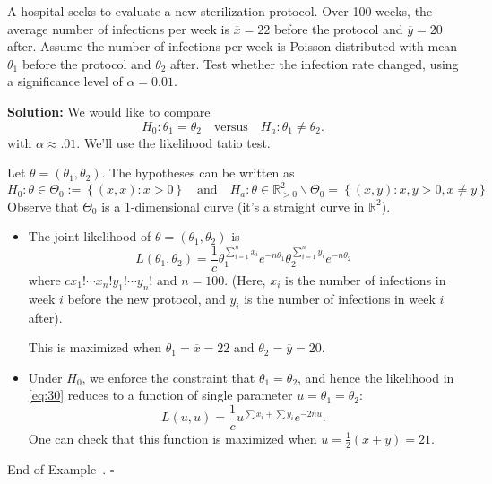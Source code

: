 \documentclass[10pt]{article}
\theoremstyle{definition}
\newtheorem{example}[theorem]{Example}
\renewenvironment{example}
{\begin{oldexample}}
  {\par\smallskip\hfill   End of Example~\theexample. $\square$    \par\end{oldexample}}
\newcommand{\vt}{\vskip 5mm} %
\newcommand{\Fl}{\vt\noindent\textbf} %
\newcommand{\1}[1]{\textbf{1}_{\left[#1\right]}} %
\def\R{\mathbb{R}} %
\begin{document}
\begin{example}[Example 10.25 in textbook]
  A hospital seeks to evaluate a new sterilization protocol. Over 100 weeks,
  the average number of infections per week is $\overline{x}=22$ before the
  protocol and $\overline{y}=20$ after. Assume the number of infections per
  week is Poisson distributed with mean $\theta_{1}$ before the protocol and
  $\theta_{2}$ after. Test whether the infection rate changed, using a
  significance level of $\alpha=0.01$.

  \Fl{Solution:} We would like to compare
  \begin{equation*}
    H_{0}:\theta_{1}=\theta_{2}
    \quad \text{versus} \quad
    H_{a}:\theta_{1}\neq\theta_{2}.
  \end{equation*}
  with $\alpha\approx .01$. We'll use the likelihood tatio test.

  Let $\theta=(\theta_{1},\theta_{2})$. The hypotheses can be written as
  \begin{equation*}
    H_{0}: \theta\in \Theta_{0}:=\left\{(x,x):x>0\right\}
    \quad \text{and} \quad
    H_{a}: \theta\in \R^{2}_{>0}\backslash \Theta_{0}=\left\{(x,y): x,y>0, x\neq y\right\} 
  \end{equation*}
  Observe that $\Theta_{0}$ is a 1-dimensional curve (it's a straight curve in
  $\R^{2}$).
  
  \begin{itemize}
    \item The joint likelihood of $\theta=(\theta_{1},\theta_{2})$ is
    \begin{equation}\label{eq:30}
      L(\theta_{1},\theta_{2}) 
      = \frac{1}{c} \theta_{1}^{\sum_{i=1}^{n}x_{i} }e^{-n\theta_{1}}\theta_{2}^{\sum_{i=1}^{n}y_{i} }e^{-n\theta_{2}}
    \end{equation}
    where $cx_{1}!\cdots x_{n}!y_{1}!\cdots y_{n}!$ and $n=100$. (Here,
    $x_{i}$ is the number of infections in week $i$ before the new protocol,
    and $y_{i}$ is the number of infections in week $i$ after).

    This is maximized when $\theta_{1}=\overline{x}=22$ and
    $\theta_{2}=\overline{y}=20$.

    \item Under $H_{0}$, we enforce the constraint that
    $\theta_{1}=\theta_{2}$, and hence the likelihood in \cref{eq:30} reduces
    to a function of single parameter $u=\theta_{1}=\theta_{2}$:
    \begin{equation*}
      L(u,u) = \frac{1}{c}u^{\sum x_{i}+\sum y_{i}  }e^{-2nu}.
    \end{equation*}
    One can check that this function is maximized when
    $u=\frac{1}{2}(\overline{x}+\overline{y})=21$.
  \end{itemize}
  

\end{example}
\end{document}
